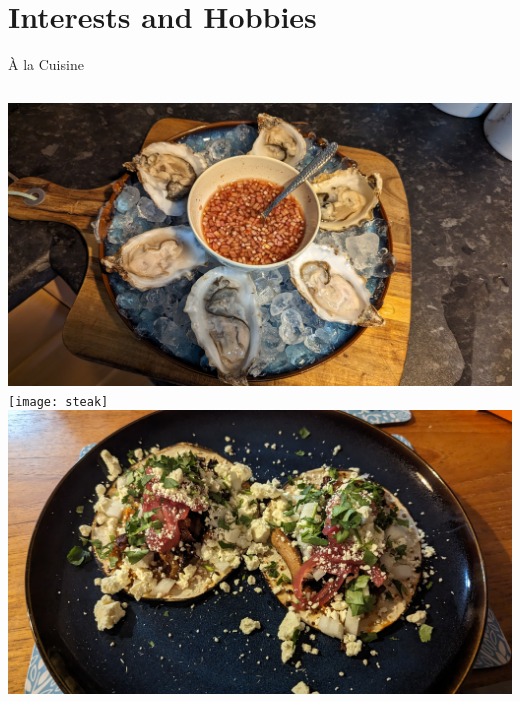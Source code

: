 \documentclass[10pt]{beamer}
\begin{document}
  \section{Interests and Hobbies}
  \begin{frame}{\`A la Cuisine}
    \begin{columns}
        \includegraphics[width=\textwidth]{oysters}\\
        \vspace{0.2cm}
        \texttt{[image: steak]}\\
        \vspace{0.2cm}
        \includegraphics[width=\textwidth]{tacos}


\end{columns}
\end{frame}
\end{document}

